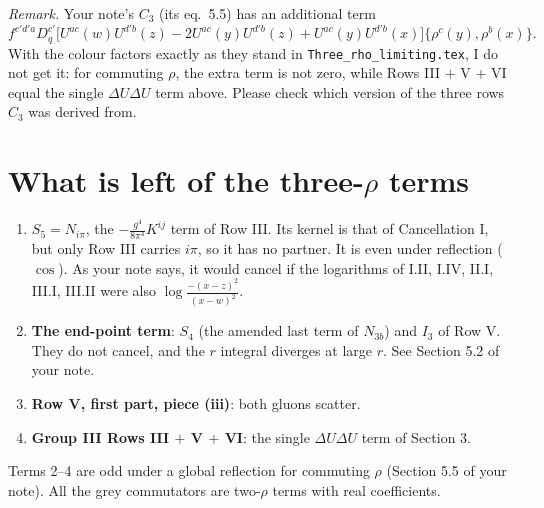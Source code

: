 \documentclass[10pt]{article}
\begin{document}
\noindent\textit{Remark.} Your note's $C_{3}$ (its eq.\ 5.5) has an additional term\[f^{c'd'a}D^{c'}_{q}\big[U^{ac}(w)U^{d'b}(z)-2U^{ac}(y)U^{d'b}(z)+U^{ac}(y)U^{d'b}(x)\big]\{\rho^{c}(y),\rho^{b}(x)\}.\] With the colour factors exactly as they stand in \texttt{Three\_rho\_limiting.tex}, I do not get it: for commuting $\rho$, the extra term is not zero, while Rows III $+$ V $+$ VI equal the single $\Delta U\Delta U$ term above. Please check which version of the three rows $C_{3}$ was derived from.

\section{What is left of the three-$\rho$ terms}
\begin{enumerate}
\item \textbf{$S_{5}=N_{i\pi}$}, the $-\frac{g^{4}}{8\pi^{4}}K^{ij}$ term of Row III. Its kernel is that of Cancellation I, but only Row III carries $i\pi$, so it has no partner. It is even under reflection ($\cos$). As your note says, it would cancel if the logarithms of I.II, I.IV, II.I, III.I, III.II were also $\log\frac{-(x-z)^{2}}{(x-w)^{2}}$.
\item \textbf{The end-point term}: $S_{4}$ (the amended last term of $N_{3b}$) and $I_{3}$ of Row V. They do not cancel, and the $r$ integral diverges at large $r$. See Section 5.2 of your note.
\item \textbf{Row V, first part, piece (iii)}: both gluons scatter.
\item \textbf{Group III Rows III $+$ V $+$ VI}: the single $\Delta U\Delta U$ term of Section 3.
\end{enumerate}
Terms 2--4 are odd under a global reflection for commuting $\rho$ (Section 5.5 of your note). All the grey commutators are two-$\rho$ terms with real coefficients.
\end{document}
